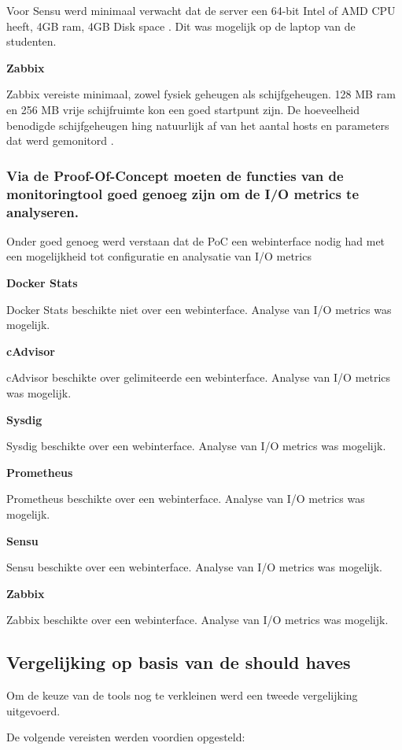 Voor Sensu werd minimaal verwacht dat de server een 64-bit Intel of AMD CPU heeft, 4GB ram, 4GB Disk space \autocite{Sensu}. Dit was mogelijk op de laptop van de studenten.

\textbf{Zabbix}

Zabbix vereiste minimaal, zowel fysiek geheugen als schijfgeheugen. 128 MB ram en 256 MB vrije schijfruimte kon een goed startpunt zijn. De hoeveelheid benodigde schijfgeheugen hing natuurlijk af van het aantal hosts en parameters dat werd gemonitord \autocite{ZabbixB}. 

\subsubsection{Via de Proof-Of-Concept moeten de functies van de monitoringtool goed genoeg zijn om de I/O metrics te analyseren.}

Onder goed genoeg werd verstaan dat de PoC een webinterface nodig had met een mogelijkheid tot configuratie en analysatie van I/O metrics

\textbf{Docker Stats} 

Docker Stats beschikte niet over een webinterface. Analyse van I/O metrics was mogelijk.

\textbf{cAdvisor}

cAdvisor beschikte over gelimiteerde een webinterface. Analyse van I/O metrics was mogelijk.

\textbf{Sysdig}

Sysdig beschikte over een webinterface. Analyse van I/O metrics was mogelijk.

\textbf{Prometheus}

Prometheus beschikte over een webinterface. Analyse van I/O metrics was mogelijk.

\textbf{Sensu}

Sensu beschikte over een webinterface. Analyse van I/O metrics was mogelijk.

\textbf{Zabbix}

Zabbix beschikte over een webinterface. Analyse van I/O metrics was mogelijk.

\subsection{Vergelijking op basis van de should haves}

Om de keuze van de tools nog te verkleinen werd een tweede vergelijking uitgevoerd.

De volgende vereisten werden voordien opgesteld:

